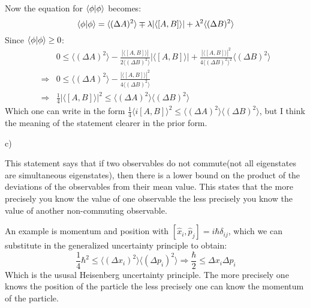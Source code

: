 \documentclass[a4paper,12pt]{article}
\begin{document}
$\phantom{1.}$
\begin{minipage}[t]{0.90\textwidth}
  $\phantom{b)}$
  \begin{minipage}[t]{\textwidth}
    Now the equation for $\braket{\phi | \phi}$ becomes:
    \begin{equation*}
      \braket{\phi|\phi} =  \langle (\Delta A)^2 \rangle \mp \lambda |\langle [A,B]\rangle| + \lambda^2\langle (\Delta B)^2 \rangle\\
    \end{equation*}
    Since $\braket{\phi|\phi} \geq 0$:
    \begin{align*}
      & 0 \leq \langle (\Delta A)^2 \rangle - \frac{|\langle [A,B]\rangle |}{2\langle (\Delta B)^2 \rangle} |\langle [A,B]\rangle | + \frac{|\langle [A, B]\rangle|^2}{4\langle (\Delta B)^2 \rangle^2}\langle (\Delta B)^2 \rangle\\
        \Rightarrow & 0 \leq \langle (\Delta A)^2 \rangle - \frac{|\langle [A, B]\rangle|^2}{4\langle (\Delta B)^2 \rangle}\\
        \Rightarrow & \frac{1}{4} |\langle [A, B]\rangle|^2 \leq \langle (\Delta A)^2 \rangle \langle (\Delta B)^2 \rangle
    \end{align*}
    Which one can write in the form $\frac{1}{4} \langle i [A,B]\rangle^2 \leq \langle (\Delta A)^2 \rangle \langle (\Delta B)^2 \rangle$, but I think the meaning of the statement clearer in the prior form.\\
  \end{minipage} 

  c)
  \begin{minipage}[t]{\textwidth}
    This statement says that if two observables do not commute(not all eigenstates are simultaneous eigenstates), then there is a lower bound on the product of the deviations of the observables from their mean value.
    This states that the more precisely you know the value of one observable the less precisely you know the value of another non-commuting observable.

    An example is momentum and position with $[\hat x_i, \hat p_j] = i \hbar \delta_{ij}$, which we can substitute in the generalized uncertainty principle to obtain:
    \begin{equation*}
      \frac{1}{4} \hbar^2 \leq \langle (\Delta x_i)^2 \rangle \langle (\Delta p_i)^2 \rangle \Rightarrow \frac{\hbar}{2} \leq \Delta x_i \Delta p_i
    \end{equation*}
    Which is the ususal Heisenberg uncertainty principle.
    The more precisely one knows the position of the particle the less precisely one can know the momentum of the particle.
  \end{minipage}
\end{minipage}
\end{document}
